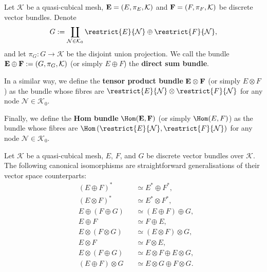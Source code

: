 \begin{definition}
  Let $\mathcal{K}$ be a quasi-cubical mesh,
  ${\bf E} = (E, \pi_E, \mathcal{K})$ and ${\bf F} = (F, \pi_F, \mathcal{K})$
  be discrete vector bundles.
  Denote 
  \begin{equation}
    G :=
    \coprod_{\mathcal{N} \in \mathcal{K}_0}
      \restrict{E}{\mathcal{N}} \oplus \restrict{F}{\mathcal{N}},
  \end{equation}
  and let $\pi_G \colon G \to \mathcal{K}$ be the disjoint union projection.
  We call the bundle ${\bf E} \oplus {\bf F} := (G, \pi_G, \mathcal{K})$
  (or simply $E \oplus F$) the \textbf{direct sum bundle}.

  In a similar way, we define the \textbf{tensor product bundle}
  ${\bf E} \otimes {\bf F}$ (or simply $E \otimes F$)
  as the bundle whose fibres are
  $\restrict{E}{\mathcal{N}} \otimes \restrict{F}{\mathcal{N}}$
  for any node $\mathcal{N} \in \mathcal{K}_0$.

  Finally, we define the \textbf{Hom bundle}
  $\Hom({\bf E}, {\bf F})$ (or simply $\Hom(E, F)$)
  as the bundle whose fibres are
  $\Hom\left(\restrict{E}{\mathcal{N}}, \restrict{F}{\mathcal{N}}\right)$
  for any node $\mathcal{N} \in \mathcal{K}_0$.
\end{definition}
\begin{proposition}
  Let $\mathcal{K}$ be a quasi-cubical mesh, $E$, $F$, and $G$
  be discrete vector bundles over $\mathcal{K}$.
  The following canonical isomorphisms are straightforward generalisations of
  their vector space counterparts:
  \begin{subequations}
    \begin{alignat}{2}
      & (E \oplus F)^*          && \simeq E^* \oplus F^*, \\
      & (E \otimes F)^*         && \simeq E^* \otimes F^*, \\
      & E \oplus (F \oplus G)   && \simeq (E \oplus F) \oplus G, \\
      & E \oplus F              && \simeq F \oplus E, \\
      & E \otimes (F \otimes G) && \simeq (E \otimes F) \otimes G, \\
      & E \otimes F             && \simeq F \otimes E, \\
      & E \otimes (F \oplus G)  && \simeq E \otimes F \oplus E \otimes G, \\
      & (E \oplus F) \otimes G  && \simeq E \otimes G \oplus F \otimes G.
    \end{alignat}
  \end{subequations}
\end{proposition}
